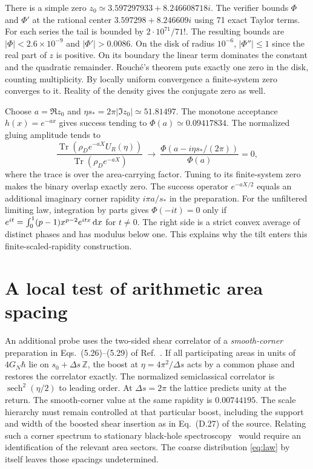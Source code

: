 \documentclass[11pt,letterpaper]{article}
\newcommand{\Tr}{\operatorname{Tr}}
\newcommand{\dd}{\mathop{}\!{\rm d}}
\newcommand{\sg}{s_*}
\begin{document}
There is a simple zero $z_0\simeq3.597297933+8.246608718i$. The verifier bounds $\Phi$ and $\Phi'$ at the rational center $3.597298+8.246609i$ using 71 exact Taylor terms. For each series the tail is bounded by $2\cdot10^{71}/71!$. The resulting bounds are $|\Phi|<2.6\times10^{-9}$ and $|\Phi'|>0.0086$. On the disk of radius $10^{-6}$, $|\Phi''|\leq1$ since the real part of $z$ is positive. On its boundary the linear term dominates the constant and the quadratic remainder. Rouch\'e's theorem puts exactly one zero in the disk, counting multiplicity. By locally uniform convergence a finite-system zero converges to it. Reality of the density gives the conjugate zero as well.

Choose $a=\Re z_0$ and $\eta\sg=2\pi|\Im z_0|\simeq51.81497$. The monotone acceptance $h(x)=e^{-ax}$ gives success tending to $\Phi(a)\simeq0.09417834$. The normalized gluing amplitude tends to
\[
 \frac{\Tr(\rho_D e^{-aX}U_R(\eta))}{\Tr(\rho_D e^{-aX})}
 \ \longrightarrow\
 \frac{\Phi(a-i\eta\sg/(2\pi))}{\Phi(a)}=0 ,
\]
where the trace is over the area-carrying factor. Tuning to its finite-system zero makes the binary overlap exactly zero. The success operator $e^{-aX/2}$ equals an additional imaginary corner rapidity $i\pi a/\sg$ in the preparation. For the unfiltered limiting law, integration by parts gives $\Phi(-it)=0$ only if $e^{it}=\int_0^1(p-1)x^{p-2}e^{itx}\dd x$ for $t\ne0$. The right side is a strict convex average of distinct phases and has modulus below one. This explains why the tilt enters this finite-scaled-rapidity construction.

\section{A local test of arithmetic area spacing}
An additional probe uses the two-sided shear correlator of a \emph{smooth-corner} preparation in Eqs.~(5.26)--(5.29) of Ref.~\cite{chandra}. If all participating areas in units of $4G_N\hbar$ lie on $s_0+\Delta s\,\mathbb Z$, the boost at $\eta=4\pi^2/\Delta s$ acts by a common phase and restores the correlator exactly. The normalized semiclassical correlator is $\operatorname{sech}^2(\eta/2)$ to leading order. At $\Delta s=2\pi$ the lattice predicts unity at the return. The smooth-corner value at the same rapidity is $0.00744195$. The scale hierarchy must remain controlled at that particular boost, including the support and width of the boosted shear insertion as in Eq.~(D.27) of the source. Relating such a corner spectrum to stationary black-hole spectroscopy~\cite{bekenstein} would require an identification of the relevant area sectors. The coarse distribution \eqref{eq:law} by itself leaves those spacings undetermined.
\end{document}
